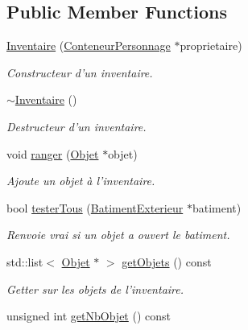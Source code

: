 \subsection*{Public Member Functions}
\begin{DoxyCompactItemize}
\item 
\hyperlink{classInventaire_ab864f4235b61f34e3814d83603d0e074}{Inventaire} (\hyperlink{classConteneurPersonnage}{Conteneur\-Personnage} $\ast$proprietaire)
\begin{DoxyCompactList}\small\item\em Constructeur d'un inventaire. \end{DoxyCompactList}\item 
\hypertarget{classInventaire_a66224efe5045d10733b010545d4166ba}{\hyperlink{classInventaire_a66224efe5045d10733b010545d4166ba}{$\sim$\-Inventaire} ()}\label{classInventaire_a66224efe5045d10733b010545d4166ba}

\begin{DoxyCompactList}\small\item\em Destructeur d'un inventaire. \end{DoxyCompactList}\item 
void \hyperlink{classInventaire_adb882101dfd892138e0d0a08bddd931c}{ranger} (\hyperlink{classObjet}{Objet} $\ast$objet)
\begin{DoxyCompactList}\small\item\em Ajoute un objet à l'inventaire. \end{DoxyCompactList}\item 
bool \hyperlink{classInventaire_a6e28591950d0e96c4e450edb933edab5}{tester\-Tous} (\hyperlink{classBatimentExterieur}{Batiment\-Exterieur} $\ast$batiment)
\begin{DoxyCompactList}\small\item\em Renvoie vrai si un objet a ouvert le batiment. \end{DoxyCompactList}\item 
\hypertarget{classInventaire_a1577e35db7d2295c57b6cd24f00e19ba}{std\-::list$<$ \hyperlink{classObjet}{Objet} $\ast$ $>$ \hyperlink{classInventaire_a1577e35db7d2295c57b6cd24f00e19ba}{get\-Objets} () const }\label{classInventaire_a1577e35db7d2295c57b6cd24f00e19ba}

\begin{DoxyCompactList}\small\item\em Getter sur les objets de l'inventaire. \end{DoxyCompactList}\item 
\hypertarget{classInventaire_ad067f644e988792ac2bd36b4625b9953}{unsigned int \hyperlink{classInventaire_ad067f644e988792ac2bd36b4625b9953}{get\-Nb\-Objet} () const }\label{classInventaire_ad067f644e988792ac2bd36b4625b9953}


\end{DoxyCompactItemize}
